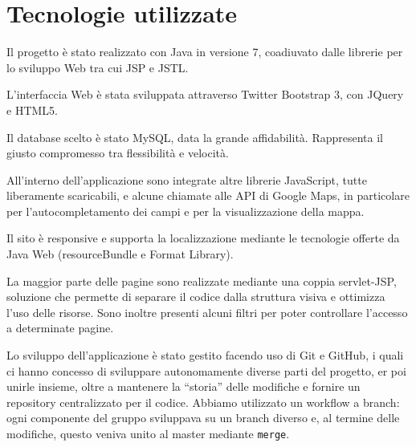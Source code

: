 
\chapter{Tecnologie utilizzate}

Il progetto è stato realizzato con Java in versione 7, coadiuvato dalle librerie per lo sviluppo Web tra cui JSP e JSTL.

L'interfaccia Web è stata sviluppata attraverso Twitter Bootstrap 3, con JQuery e HTML5.

Il database scelto è stato MySQL, data la grande affidabilità. Rappresenta il giusto compromesso tra flessibilità e velocità.

All'interno dell'applicazione sono integrate altre librerie JavaScript, tutte liberamente scaricabili, e alcune chiamate alle API di Google Maps, in particolare per l'autocompletamento dei campi e per la visualizzazione della mappa.

Il sito è responsive e supporta la localizzazione mediante le tecnologie offerte da Java Web (resourceBundle e Format Library).

La maggior parte delle pagine sono realizzate mediante una coppia servlet-JSP, soluzione che permette di separare il codice dalla struttura visiva e ottimizza l'uso delle risorse. Sono inoltre presenti alcuni filtri per poter controllare l'accesso a determinate pagine.


Lo sviluppo dell'applicazione è stato gestito facendo uso di Git e GitHub, i quali ci hanno concesso di sviluppare autonomamente diverse parti del progetto, er poi unirle insieme, oltre a mantenere la ``storia'' delle modifiche e fornire un repository centralizzato per il codice.
Abbiamo utilizzato un workflow a branch: ogni componente del gruppo sviluppava su un branch diverso e, al termine delle modifiche, questo veniva unito al master mediante \texttt{merge}.




